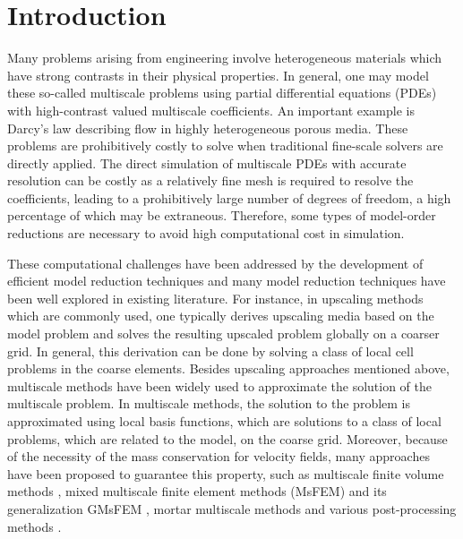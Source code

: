\documentclass{article}[11pt]
\theoremstyle{definition}
\begin{document}
\section{Introduction}
Many problems arising from engineering involve heterogeneous materials which have strong contrasts in their physical properties.
In general, one may model these so-called multiscale problems using partial differential 
equations (PDEs) with high-contrast valued multiscale coefficients. 
An important example is Darcy's law describing flow in highly heterogeneous porous media. 
These problems are prohibitively costly to solve when traditional fine-scale solvers are directly applied. 
The direct simulation of multiscale PDEs with accurate resolution can be costly as a relatively fine mesh is required to resolve the coefficients, leading to a prohibitively large number of degrees of freedom, a high percentage of which may be extraneous. 
Therefore, some types of model-order reductions are necessary to avoid high computational cost in simulation. 

These computational challenges have been addressed by the development of 
efficient model reduction techniques and many model reduction techniques have been well explored in existing literature. 
For instance, in upscaling methods \cite{chen2003coupled, durlofsky1991numerical, wu2002analysis, gao2015numerical} which are commonly used, one typically derives upscaling media based on the model problem and solves the resulting upscaled problem globally on a coarser grid. In general, this derivation can be done by solving a class of local cell problems in the coarse elements. Besides upscaling approaches mentioned above, multiscale methods  \cite{efendiev2009multiscale,efendiev2000convergence,hou1997multiscale,hughes1995multiscale} have been widely used to approximate the solution of the multiscale problem. 
In multiscale methods, the solution to the problem is approximated using local basis functions, which are solutions to a class of local problems, which are related to the model, on the coarse grid. 
Moreover, because of the necessity of the mass conservation for velocity fields, many approaches have been proposed to guarantee this property, such as multiscale finite volume methods  \cite{cortinovis2014iterative,hajibeygi2011hierarchical,jenny2003multi,lie2017feature,lunati2004multi}, mixed multiscale finite element methods (MsFEM) \cite{aarnes2004use,aarnes2008mixed,chen2003mixed} and its generalization GMsFEM \cite{chan2016adaptive,chen2016least,chung2015mixedg,chung2016mixed,chung2016adaptive,chung2016mixedwave}, mortar multiscale methods \cite{arbogast2007multiscale,chung2016enriched,peszynska2005mortar,peszynska2002mortar} and various post-processing methods \cite{bush2013application,odsaeter2017postprocessing}.
\end{document}
